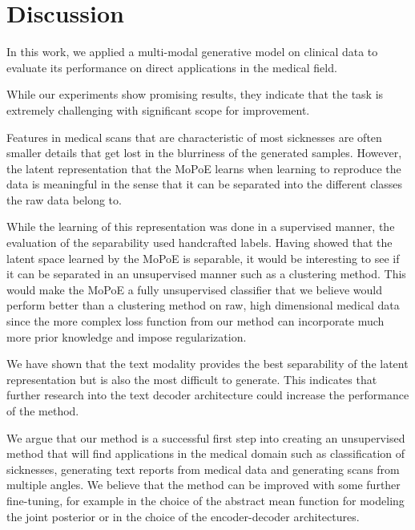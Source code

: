 \section{Discussion}
In this work, we applied a multi-modal generative model on clinical data to evaluate its performance on direct applications in the medical field.

While our experiments show promising results, they indicate that the task is extremely challenging with significant scope for improvement.

Features in medical scans that are characteristic of most sicknesses are often smaller details that get lost in the blurriness of the generated samples.
However, the latent representation that the MoPoE learns when learning to reproduce the data is meaningful in the sense that it can be separated into the different classes the raw data belong to.


While the learning of this representation was done in a supervised manner, the evaluation of the separability used handcrafted labels.
Having showed that the latent space learned by the MoPoE is separable, it would be interesting to see if it can be separated in an unsupervised manner such as a clustering method.
This would make the MoPoE a fully unsupervised classifier that we believe would perform better than a clustering method on raw, high dimensional medical data since the more complex loss function from our method can incorporate much more prior knowledge and impose regularization.


We have shown that the text modality provides the best separability of the latent representation but is also the most difficult to generate.
This indicates that further research into the text decoder architecture could increase the performance of the method.



We argue that our method is a successful first step into creating an unsupervised method that will find applications in the medical domain such as classification of sicknesses, generating text reports from medical data and generating scans from multiple angles.
We believe that the method can be improved with some further fine-tuning, for example in the choice of the abstract mean function for modeling the joint posterior or in the choice of the encoder-decoder architectures.